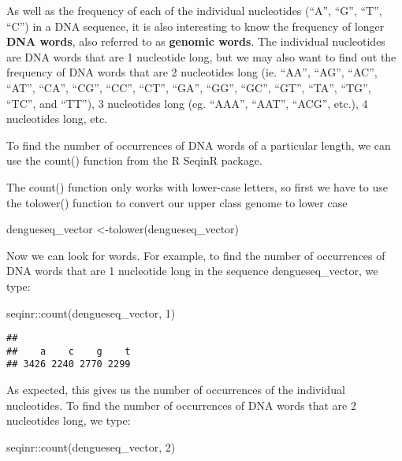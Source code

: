 \documentclass[
]{book}
\newenvironment{Shaded}{\begin{snugshade}}{\end{snugshade}}
\newcommand{\DecValTok}[1]{\textcolor[rgb]{0.00,0.00,0.81}{#1}}
\newcommand{\FunctionTok}[1]{\textcolor[rgb]{0.00,0.00,0.00}{#1}}
\newcommand{\NormalTok}[1]{#1}
\newcommand{\OtherTok}[1]{\textcolor[rgb]{0.56,0.35,0.01}{#1}}
\newcommand{\SpecialCharTok}[1]{\textcolor[rgb]{0.00,0.00,0.00}{#1}}
\begin{document}
As well as the frequency of each of the individual nucleotides (``A'', ``G'', ``T'', ``C'') in a DNA sequence, it is also interesting to know the frequency of longer \textbf{DNA words}, also referred to as \textbf{genomic words}. The individual nucleotides are DNA words that are 1 nucleotide long, but we may also want to find out the frequency of DNA words that are 2 nucleotides long (ie. ``AA'', ``AG'', ``AC'', ``AT'', ``CA'', ``CG'', ``CC'', ``CT'', ``GA'', ``GG'', ``GC'', ``GT'', ``TA'', ``TG'', ``TC'', and ``TT''), 3 nucleotides long (eg. ``AAA'', ``AAT'', ``ACG'', etc.), 4 nucleotides long, etc.

To find the number of occurrences of DNA words of a particular length, we can use the count() function from the R SeqinR package.

The count() function only works with lower-case letters, so first we have to use the tolower() function to convert our upper class genome to lower case

\begin{Shaded}
\begin{Highlighting}[]
\NormalTok{dengueseq\_vector }\OtherTok{\textless{}{-}}\FunctionTok{tolower}\NormalTok{(dengueseq\_vector)}
\end{Highlighting}
\end{Shaded}

Now we can look for words. For example, to find the number of occurrences of DNA words that are 1 nucleotide long in the sequence dengueseq\_vector, we type:

\begin{Shaded}
\begin{Highlighting}[]
\NormalTok{seqinr}\SpecialCharTok{::}\FunctionTok{count}\NormalTok{(dengueseq\_vector, }\DecValTok{1}\NormalTok{)}
\end{Highlighting}
\end{Shaded}

\begin{verbatim}
## 
##    a    c    g    t 
## 3426 2240 2770 2299
\end{verbatim}

As expected, this gives us the number of occurrences of the individual nucleotides. To find the number of occurrences of DNA words that are 2 nucleotides long, we type:

\begin{Shaded}
\begin{Highlighting}[]
\NormalTok{seqinr}\SpecialCharTok{::}\FunctionTok{count}\NormalTok{(dengueseq\_vector, }\DecValTok{2}\NormalTok{)}
\end{Highlighting}
\end{Shaded}
\end{document}
